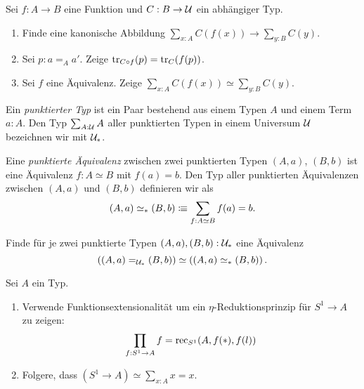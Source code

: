 \documentclass{uebung}
\begin{document}

\begin{exercise}
  Sei $f:A \to B$ eine Funktion und $C : B \to \mathcal{U}$ ein abhängiger Typ.
  \begin{enumerate}
    \item Finde eine kanonische Abbildung $\sum_{x:A} C(f(x)) \to \sum_{y:B} C(y)$.
    \item Sei $p:a=_A a'$. 
      Zeige $\mathrm{tr}_{C\circ f}(p) = \mathrm{tr}_C (f(p))$.
    \item Sei $f$ eine Äquivalenz.
      Zeige $\sum_{x:A} C(f(x)) \simeq \sum_{y:B} C(y)$.
  \end{enumerate}
\end{exercise}

\begin{exercise}
  Ein \emph{punktierter Typ} ist ein Paar bestehend aus einem Typen $A$ und einem Term $a:A$.
  Den Typ $\sum_{A:\mathcal{U}}A$ aller punktierten Typen in einem Universum $\mathcal{U}$ bezeichnen wir mit $\mathcal{U}_*$.

  Eine \emph{punktierte Äquivalenz} zwischen zwei punktierten Typen $(A,a)$, $(B,b)$ ist eine Äquivalenz $f:A\simeq B$ mit $f(a)=b$.
  Den Typ aller punktierten Äquivalenzen zwischen $(A,a)$ und $(B,b)$ definieren wir als
  $$
  (A,a) \simeq_* (B,b) \vcentcolon\mspace{-1.2mu}\equiv \sum_{f:A\simeq B} f(a) = b.
  $$

  Finde für je zwei punktierte Typen $(A,a), (B,b) : \mathcal{U}_*$ eine Äquivalenz
  $$
  \left((A,a) =_{\mathcal{U}_*} (B,b)\right) \simeq \left((A,a) \simeq_* (B,b)\right).
  $$
\end{exercise}

\begin{exercise}
  Sei $A$ ein Typ.
  \begin{enumerate}
    \item Verwende Funktionsextensionalität um ein $\eta$-Reduktionsprinzip für $S^1 \to A$ zu zeigen:
      $$
      \prod_{f:S^1 \to A} f = \mathrm{rec}_{S^1}(A, f(\ast), f(l))
      $$
    \item Folgere, dass $(S^1\to A) \simeq \sum_{x:A} x=x$.
  \end{enumerate}
\end{exercise}
\end{document}
